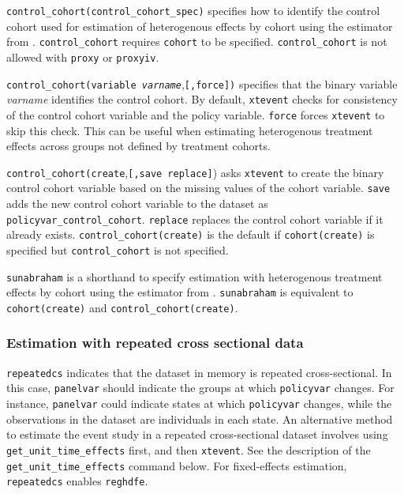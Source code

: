 \documentclass[12pt]{article}
\begin{document}
\hangpara
{\tt control\_cohort(control\_cohort\_spec)} specifies how to identify the control cohort used for estimation of heterogenous effects by cohort using the estimator from \cite{sun2021estimating}.
{\tt control\_cohort} requires {\tt cohort} to be specified.
{\tt control\_cohort} is not allowed with {\tt proxy} or {\tt proxyiv}.

\morehangpara
{\tt control\_cohort(variable \textit{varname}},{\tt [,force])} specifies that the binary variable {\it varname} identifies the control cohort.
By default, {\tt xtevent} checks for consistency of the control cohort variable and the policy variable.
{\tt force} forces {\tt xtevent} to
skip this check.
This can be useful when estimating heterogenous treatment effects across groups not defined by treatment cohorts.

\morehangpara
{\tt control\_cohort(create},{\tt [,save replace]}) asks {\tt xtevent} to create the binary control cohort variable based on the missing values of
the cohort variable.
{\tt save} adds the new control cohort variable to the dataset as {\tt policyvar\_control\_cohort}.
{\tt replace} replaces the control cohort variable if it already exists.
{\tt control\_cohort(create)} is the default if {\tt cohort(create)} is specified but {\tt control\_cohort}
is not specified.

\hangpara
{\tt sunabraham} is a shorthand to specify estimation with heterogenous treatment effects by cohort using the estimator from \cite{sun2021estimating}.
{\tt sunabraham} is equivalent to {\tt cohort(create)} and {\tt control\_cohort(create)}.

\subsubsection{Estimation with repeated cross sectional data}

\hangpara
{\tt repeatedcs} indicates that the dataset in memory is repeated cross-sectional.
In this case, {\tt panelvar} should indicate the groups at which {\tt policyvar} changes.
For instance, {\tt panelvar} could indicate states at which {\tt policyvar} changes, while the observations in the dataset are individuals in each state.
An alternative method to estimate the event study in a repeated cross-sectional dataset involves using {\tt  get\_unit\_time\_effects} first, and then {\tt xtevent}.
See the description of the {\tt get\_unit\_time\_effects} command below.
For fixed-effects estimation, {\tt repeatedcs} enables {\tt reghdfe}.
\end{document}
